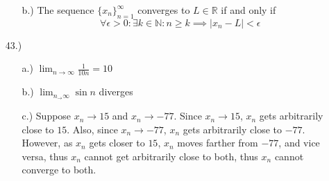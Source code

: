 \documentclass[12pt]{article}
\begin{document}
\begin{itemize}
\begin{itemize}
        \item [b.)] The sequence $\{x_n\}^\infty_{n=1}$ converges to $L\in\mathbb{R}$ if and only if
        \[\forall\epsilon>0:\exists k\in\mathbb{N}:n\geq k\implies\vert x_n-L\vert<\epsilon\]
    \end{itemize}




    \pagebreak
    \item [43.)] \begin{itemize}
        \item [a.)] $\displaystyle\lim_{n\to\infty}\frac{1}{10n}=10$

        \item [b.)] $\displaystyle\lim_{n_\to\infty}\sin n$ diverges

        \item [c.)] Suppose $x_n\to15$ and $x_n\to-77$. Since $x_n\to15$, $x_n$ gets arbitrarily close to $15$. Also, since $x_n\to-77$, $x_n$ gets arbitrarily close to $-77$. However, as $x_n$ gets closer to $15$, $x_n$ moves farther from $-77$, and vice versa, thus $x_n$ cannot get arbitrarily close to both, thus $x_n$ cannot converge to both.
    \end{itemize}



\end{itemize}
\end{document}
